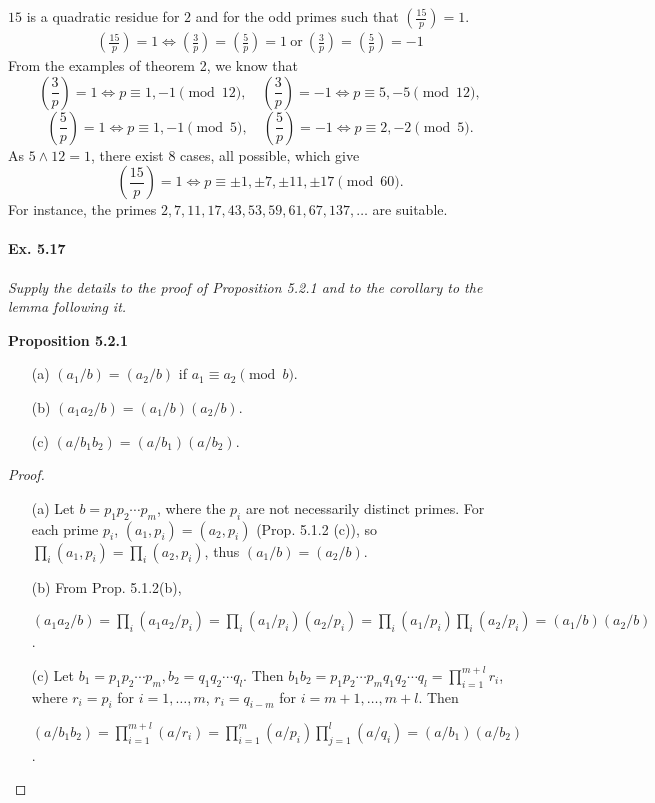 \documentclass[11pt,a4paper]{article}
\newcommand{\legendre}[2]{\genfrac{(}{)}{}{}{#1}{#2}}
\begin{document}
\bigskip

$15$ is a  quadratic residue for $2$ and for the odd primes such that $\legendre{15}{p} = 1$.
\begin{align*}
\legendre{15}{p} = 1 \iff \legendre{3}{p} = \legendre{5}{p} = 1\ \mathrm{or} \ \legendre{3}{p} = \legendre{5}{p} = -1
\end{align*}
From the examples of theorem 2, we know that
$$\legendre{3}{p} = 1 \iff p\equiv 1,-1 \pmod {12}, \quad \legendre{3}{p} = -1 \iff  p \equiv  5 ,-5\pmod {12},$$
$$\legendre{5}{p} = 1 \iff p \equiv 1,-1 \pmod {5}, \quad \legendre{5}{p} = -1 \iff p \equiv 2,-2 \pmod {5}.$$
As $5\wedge 12 = 1$, there exist 8 cases, all possible, which give
$$\legendre{15}{p} = 1 \iff p \equiv \pm 1,\pm 7, \pm 11, \pm 17 \pmod {60}.$$
For instance, the primes $2,7,11,17, 43, 53,59,  61,67, 137, \ldots$ are suitable.

\paragraph{Ex. 5.17}

{\it Supply the details to the proof of Proposition 5.2.1 and to the corollary to the lemma following it.
}

\medskip

{\bf Proposition 5.2.1} 
{\it
\begin{enumerate}
\item[(a)] $(a_1/b) = (a_2/b)$ if $a_1\equiv a_2 \pmod b$.
\item[(b)] $(a_1a_2/b) = (a_1/b)(a_2/b)$.
\item[(c)] $(a/b_1b_2) = (a/b_1)(a/b_2)$.
\end{enumerate}
}
\begin{proof}  
\begin{enumerate}
\item[(a)] Let $b = p_1p_2\cdots p_m$, where the $p_i$ are not necessarily distinct primes.
For each prime $p_i$, $(a_1,p_i) = (a_2,p_i)$ (Prop. 5.1.2 (c)), so $\prod_i (a_1,p_i) = \prod_i (a_2,p_i)$, thus $(a_1/b) = (a_2/b)$.
\item[(b)] From Prop. 5.1.2(b), 

$(a_1a_2/b) = \prod_i (a_1a_2/p_i) = \prod_i (a_1/p_i)(a_2/p_i) =\prod_i (a_1/p_i)\prod_i (a_2/p_i) = (a_1/b)(a_2/b)$.

\item[(c)] Let $b_1 = p_1p_2\cdots p_m, b_2 = q_1 q_2\cdots q_l$. Then $b_1b_2 = p_1p_2\cdots p_m q_1 q_2\cdots q_l = \prod_{i=1}^{m+l} r_i$, where $r_i = p_i$ for $i=1,\ldots,m$, $r_i = q_{i-m}$ for $i = m+1,\ldots, m+l$. Then

$(a/b_1b_2) =\prod_{i=1}^{m+l} (a/ r_i) =  \prod_{i=1}^m (a/p_i) \prod_{j=1}^l(a/q_i) = (a/b_1)(a/b_2)$. 
\end{enumerate}
\end{proof}
\end{document}
